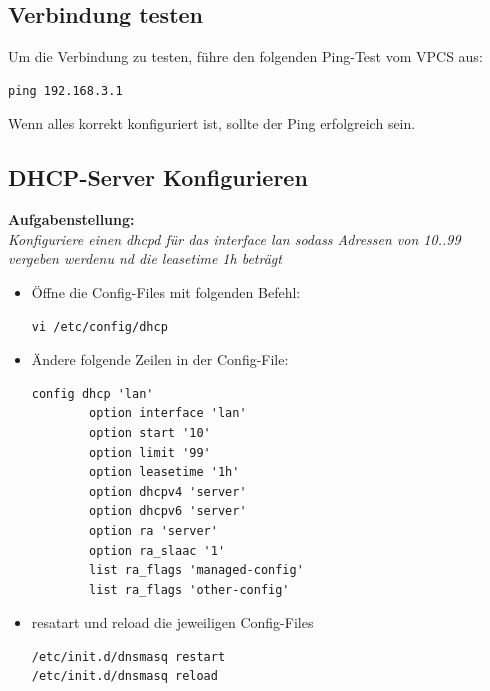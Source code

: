 \documentclass[12pt, a4paper]{article}\usepackage{listings}
\begin{document}
\subsection{Verbindung testen}

Um die Verbindung zu testen, führe den folgenden Ping-Test vom VPCS aus:

\begin{verbatim}
ping 192.168.3.1
\end{verbatim}

Wenn alles korrekt konfiguriert ist, sollte der Ping erfolgreich sein.

\newpage

\subsection{DHCP-Server Konfigurieren}
\textbf{Aufgabenstellung:}\\
\textit{Konfiguriere einen dhcpd für das interface lan sodass Adressen von 10..99 vergeben werdenu nd die leasetime 1h beträgt}

\begin{itemize}
\item Öffne die Config-Files mit folgenden Befehl:
\begin{verbatim}
vi /etc/config/dhcp
\end{verbatim}
\item Ändere folgende Zeilen in der Config-File:
\begin{verbatim}
config dhcp 'lan'
        option interface 'lan'
        option start '10'
        option limit '99'
        option leasetime '1h'
        option dhcpv4 'server'
        option dhcpv6 'server'
        option ra 'server'
        option ra_slaac '1'
        list ra_flags 'managed-config'
        list ra_flags 'other-config'
\end{verbatim}
\item resatart und reload die jeweiligen Config-Files
\begin{verbatim}
/etc/init.d/dnsmasq restart
/etc/init.d/dnsmasq reload
\end{verbatim}
\end{itemize}

\newpage
\end{document}
